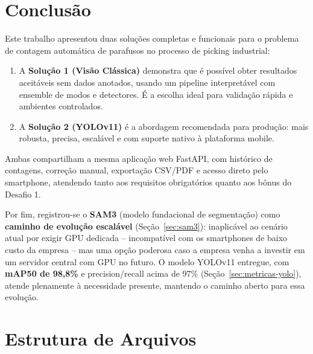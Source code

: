 \documentclass[12pt,a4paper]{article}
\begin{document}
\section{Conclus\~ao}

Este trabalho apresentou duas solu\c{c}\~oes completas e funcionais para o problema
de contagem autom\'atica de parafusos no processo de picking industrial:

\begin{enumerate}[leftmargin=*, label=\arabic*.]
  \item A \textbf{Solu\c{c}\~ao 1 (Vis\~ao Cl\'assica)} demonstra que \'e poss\'ivel
        obter resultados aceit\'aveis sem dados anotados, usando um pipeline
        interpret\'avel com ensemble de modos e detectores. \'E a escolha ideal
        para valida\c{c}\~ao r\'apida e ambientes controlados.

  \item A \textbf{Solu\c{c}\~ao 2 (YOLOv11)} \'e a abordagem recomendada para
        produ\c{c}\~ao: mais robusta, precisa, escal\'avel e com suporte nativo
        \`a plataforma mobile.
\end{enumerate}

Ambas compartilham a mesma aplica\c{c}\~ao web FastAPI, com hist\'orico de
contagens, corre\c{c}\~ao manual, exporta\c{c}\~ao CSV/PDF e acesso direto pelo
smartphone, atendendo tanto aos requisitos obrigat\'orios quanto aos b\^onus
do Desafio 1.

\medskip
Por fim, registrou-se o \textbf{SAM3} (modelo fundacional de segmenta\c{c}\~ao) como
\textbf{caminho de evolu\c{c}\~ao escal\'avel} (Se\c{c}\~ao~\ref{sec:sam3}): inaplic\'avel
ao cen\'ario atual por exigir GPU dedicada -- incompat\'ivel com os smartphones de baixo
custo da empresa -- mas uma op\c{c}\~ao poderosa caso a empresa venha a investir em um
servidor central com GPU no futuro. O modelo YOLOv11 entregue, com \textbf{mAP50 de
98,8\%} e precision/recall acima de 97\% (Se\c{c}\~ao~\ref{sec:metricas-yolo}), atende
plenamente \`a necessidade presente, mantendo o caminho aberto para essa evolu\c{c}\~ao.

\appendix
\section{Estrutura de Arquivos}
\end{document}
